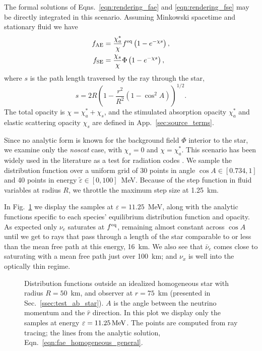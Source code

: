 \documentclass[aps,floatfix,prd,superscriptaddress,twocolumn]{revtex4-1}
\begin{document}
The formal solutions of
Eqns.~\ref{eqn:rendering_fae} and \ref{eqn:rendering_fse}
may be directly integrated in this scenario. Assuming Minkowski spacetime
and stationary fluid we have
\begin{align}
  \label{eqn:fae_homogeneous_general}
  f_{\rm AE} &=
  \frac{\chi_a^{*}}{\chi} f^{\rm eq} \left(1-e^{-\chi s}\right), \\
  \label{eqn:fse_homogeneous_general}
  f_{\rm SE} &=
  \frac{\chi_s}{\chi} \Phi \left(1-e^{-\chi s}\right),
\end{align}
where $s$ is the path length traversed by the ray through the star,
\begin{equation}
  \label{eqn:geometric_s}
  s = 2 R \left(1-\frac{r^2}{R^2}(1-\cos^2 A)\right)^{1/2}.
\end{equation}
The total opacity is $\chi=\chi_a^*+\chi_s$, and the stimulated absorption
opacity $\chi_a^*$ and elastic scattering opacity $\chi_s$
are defined in App.~\ref{sec:source_terms}.

Since no analytic form is known for the background field $\Phi$
interior to the star, we examine only the \emph{noscat} case,
with $\chi_s=0$ and $\chi=\chi_a^{*}$.
This scenario has been widely used in the literature as a test for
radiation codes
\cite{smit1997-two_moment,abdi2012-monte_carlo,fouc2015-m1_nsbh}.
We sample the distribution function over a uniform grid of
30 points in angle $\cos A \in [0.734,1]$ and
40 points in energy $\tilde{\varepsilon} \in [0,100]$~MeV.
Because of the step function in fluid variables at radius $R$,
we throttle the maximum step size at 1.25~km.

In Fig.~\ref{fig:f_absorption_sphere} we display the samples at
$\varepsilon=11.25$~MeV, along with the analytic functions
specific to each species' equilibrium distribution function and opacity.
As expected only $\nu_e$ saturates at $f^{\rm eq}$, remaining almost
constant across $\cos A$ until we get to rays that pass through a length
of the star comparable to or less than the mean free path at this energy,
16~km. We also see that $\bar{\nu}_e$ comes close to saturating with
a mean free path just over 100~km; and $\nu_x$ is well into the optically
thin regime.

\begin{figure}
  \resizebox{\columnwidth}{!}{}
  \caption{Distribution functions outside an idealized homogeneous star
    with radius $R=50$~km, and observer at $r=75$~km
    (presented in Sec.~\ref{ssec:test_ab_star}).
    $A$ is the angle between the neutrino momentum and the $\hat{r}$ direction.
    In this plot we display only the samples at energy
    $\varepsilon=11.25\,{\rm MeV}$.
    The points are computed from ray tracing; the lines from the analytic
    solution, Eqn.~\ref{eqn:fae_homogeneous_general}.
  }
  \label{fig:f_absorption_sphere}
\end{figure}
\end{document}
